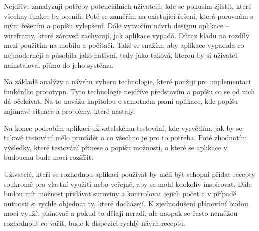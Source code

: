 Nejdříve zanalyzuji potřeby potenciálních uživatelů, kde se pokusím zjistit, které všechny funkce by ocenili. Poté se
zaměřím na existující řešení, která porovnám s mým řešením a popíšu vylepšení. Dále vytvořím návrh designu aplikace -- wireframy,
které zároveň zachycují, jak aplikace vypadá. Důraz kladu na rozdíly mezi použitím na mobilu a počítači. Také se snažím, aby
aplikace vypadala co nejmoderněji a působila jako nativní, tedy jako taková, kterou by si uživatel nainstaloval přímo do jeho systému.

Na základě analýzy a návrhu vyberu technologie, které použiji pro implementaci funkčního prototypu. Tyto technologie nejdříve představím
a popíšu co se od nich dá očekávat. Na to navážu kapitolou o samotném psaní aplikace, kde popíšu zajímavé situace a problémy, které nastaly.

Na konec podrobím aplikaci uživatelskému testování, kde vysvětlím, jak by se takové testování mělo provádět a co všechno je pro to potřeba.
Poté zhodnotím výsledky, které testování přinese a popíšu možnosti, o které se aplikace v budoucnu bude moci rozšířit.

Uživatelé, kteří se rozhodnou aplikaci používat by měli být schopni přidat recepty soukromě pro vlastní využití nebo veřejně,
aby se mohl kdokoliv inspirovat. Dále budou mít možnost přidávat suroviny a kontrolovat jejich počet a v případě nutnosti si
rychle objednat ty, které docházejí. K zjednodušení plánování budou moci využít plánovač a pokud to dělají neradi, ale naopak
se často nemůžou rozhodnout co vařit, bude k dispozici rychlý návrh receptu.
